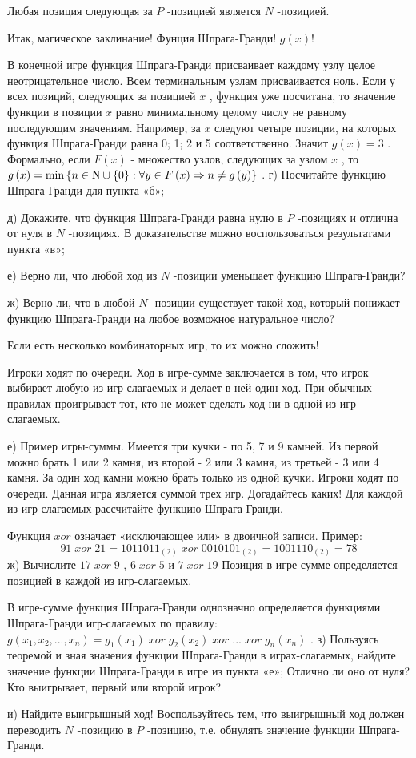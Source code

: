 {Любая позиция следующая за  $P$ -позицией является  $N$ -позицией.\par
Итак, магическое заклинание! Фунция Шпрага-Гранди!  $g\left(x\right)$!\par
В конечной игре функция Шпрага-Гранди присваивает каждому узлу целое неотрицательное число.
Всем терминальным узлам присваивается ноль.
Если у всех позиций, следующих за позицией  $x$ , функция уже посчитана, то значение функции в позиции  $x$  равно минимальному целому числу не равному последующим значениям.
Например, за  $x$  следуют четыре позиции, на которых функция Шпрага-Гранди равна 0; 1; 2 и 5 соответственно. Значит  $g\left(x\right)=3$ . Формально, если  $F\left(x\right)$  - множество узлов, следующих за узлом  $x$ , то  $g\left(x\right)=\min \left\{n\in {\rm N} \cup \left\{0\right\}:\forall y\in F\left(x\right)\Rightarrow n\ne g\left(y\right)\right\}$ .
г)	Посчитайте функцию Шпрага-Гранди для пункта «б»;\par
д)	Докажите, что функция Шпрага-Гранди равна нулю в  $P$ -позициях и отлична от нуля в  $N$ -позициях. В доказательстве можно воспользоваться результатами пункта «в»;\par
е)	Верно ли, что любой ход из  $N$ -позиции уменьшает функцию Шпрага-Гранди?\par
ж)	Верно ли, что в любой  $N$ -позиции существует такой ход, который понижает функцию Шпрага-Гранди на любое возможное натуральное число?\par
Если есть несколько комбинаторных игр, то их можно сложить! \par
Игроки ходят по очереди. Ход в игре-сумме заключается в том, что игрок выбирает любую из игр-слагаемых и делает в ней один ход. При обычных правилах проигрывает тот, кто не может сделать ход ни в одной из игр-слагаемых.\par
е)	Пример игры-суммы. Имеется три кучки - по 5, 7 и 9 камней. Из первой можно брать 1 или 2 камня, из второй - 2 или 3 камня, из третьей - 3 или 4 камня. За один ход камни можно брать только из одной кучки. Игроки ходят по очереди. Данная игра является суммой трех игр. Догадайтесь каких! Для каждой из игр слагаемых рассчитайте функцию Шпрага-Гранди.\par
Функция  $xor$  означает «исключающее или» в двоичной записи. Пример:  
$$91\; xor\; 21=1011011_{\left(2\right)} \; xor\; 0010101_{\left(2\right)} =1001110_{\left(2\right)} =78$$ 
ж)	Вычислите  $17\; xor\; 9$ ,  $6\; xor\; 5$  и  $7\; xor\; 19$ 
Позиция в игре-сумме определяется позицией в каждой из игр-слагаемых.\par
{}
В игре-сумме функция Шпрага-Гранди однозначно определяется функциями Шпрага-Гранди игр-слагаемых по правилу:  $g\left(x_{1} ,x_{2} ,...,x_{n} \right)=g_{1} \left(x_{1} \right)\; xor\; g_{2} \left(x_{2} \right)\; xor\; ...\; xor\; g_{n} \left(x_{n} \right)$ .
з)	Пользуясь теоремой и зная значения функции Шпрага-Гранди в играх-слагаемых, найдите значение функции Шпрага-Гранди в игре из пункта «е»; Отлично ли оно от нуля? Кто выигрывает, первый или второй игрок?\par
и)	Найдите выигрышный ход! Воспользуйтесь тем, что выигрышный ход должен переводить  $N$ -позицию в  $P$ -позицию, т.е. обнулять значение функции Шпрага-Гранди.} 
